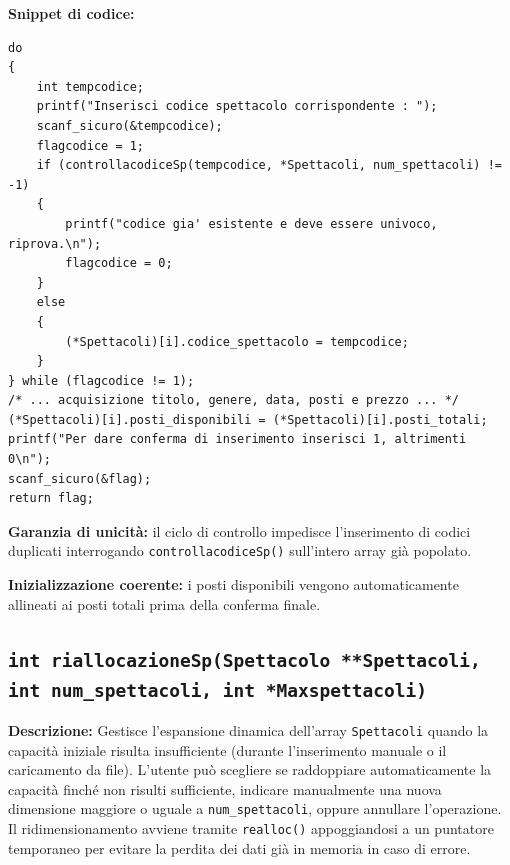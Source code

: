 \documentclass[11pt,a4paper,oneside,openany]{book}
\newenvironment{listacomp}{%
    \small
    \begin{list}{\textendash}{%
        \setlength{\topsep}{2pt}%
        \setlength{\partopsep}{0pt}%
        \setlength{\itemsep}{1pt}%
        \setlength{\parsep}{0pt}%
        \setlength{\leftmargin}{1.2em}%
    }%
}{%
    \end{list}%
}
\begin{document}
\begin{samepage}
\noindent\textbf{Snippet di codice:}
\begin{lstlisting}[caption={Validazione univocità codice e conferma inserimento in inserimentospettacolo()}]
do
{
    int tempcodice;
    printf("Inserisci codice spettacolo corrispondente : ");
    scanf_sicuro(&tempcodice);
    flagcodice = 1;
    if (controllacodiceSp(tempcodice, *Spettacoli, num_spettacoli) != -1)
    {
        printf("codice gia' esistente e deve essere univoco, riprova.\n");
        flagcodice = 0;
    }
    else
    {
        (*Spettacoli)[i].codice_spettacolo = tempcodice;
    }
} while (flagcodice != 1);
/* ... acquisizione titolo, genere, data, posti e prezzo ... */
(*Spettacoli)[i].posti_disponibili = (*Spettacoli)[i].posti_totali;
printf("Per dare conferma di inserimento inserisci 1, altrimenti 0\n");
scanf_sicuro(&flag);
return flag;
\end{lstlisting}

\begin{listacomp}
    \item \textbf{Garanzia di unicità:} il ciclo di controllo impedisce l'inserimento di codici duplicati interrogando \texttt{controllacodiceSp()} sull'intero array già popolato.
    \item \textbf{Inizializzazione coerente:} i posti disponibili vengono automaticamente allineati ai posti totali prima della conferma finale.
\end{listacomp}
\end{samepage}

\subsection[riallocazioneSp()]{\texttt{int riallocazioneSp(Spettacolo **Spettacoli, int num\_spettacoli, int *Maxspettacoli)}}\label{sec:riallocazioneSp}

\noindent\textbf{Descrizione:}
Gestisce l'espansione dinamica dell'array \texttt{Spettacoli} quando la capacità iniziale risulta insufficiente (durante l'inserimento manuale o il caricamento da file). L'utente può scegliere se raddoppiare automaticamente la capacità finché non risulti sufficiente, indicare manualmente una nuova dimensione maggiore o uguale a \texttt{num\_spettacoli}, oppure annullare l'operazione. Il ridimensionamento avviene tramite \texttt{realloc()} appoggiandosi a un puntatore temporaneo per evitare la perdita dei dati già in memoria in caso di errore.
\end{document}
